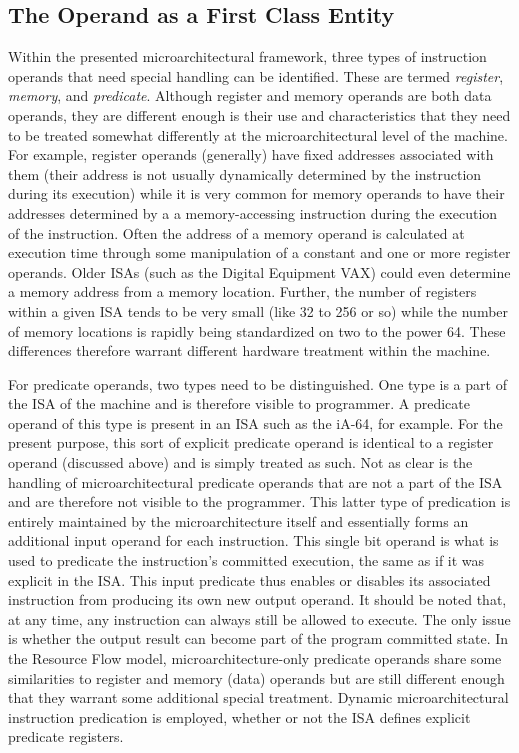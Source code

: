 \documentclass{book}
\begin{document}
\subsection{The Operand as a First Class Entity}
%
Within the presented microarchitectural framework, 
three types of instruction operands that need special handling
can be identified.
These are termed \textit{register}, \textit{memory}, and \textit{predicate}.
Although register and memory operands are both data operands,
they are different enough is their use and characteristics that
they need to be treated somewhat differently at the microarchitectural
level of the machine.  
For example, register operands (generally) have fixed addresses
associated with them (their address is not usually dynamically determined
by the instruction during its execution) while it is very common
for memory operands to have their addresses determined by a
a memory-accessing instruction during the execution of the instruction.
Often the address of a memory operand is calculated at execution
time through some manipulation of a constant and one or more register
operands.  Older ISAs (such as the Digital Equipment VAX) could
even determine a memory address from a memory location.
Further, the number of registers within a given ISA tends to be
very small (like 32 to 256 or so) while the number of memory
locations is rapidly being standardized on two to the power 64.
These differences therefore warrant different hardware treatment
within the machine.

For predicate operands, two types need to be distinguished.
One type is a part of the ISA of the machine and
is therefore visible to programmer.
A predicate operand of this type is present 
in an ISA such as the iA-64, for example. \cite{iA64}
For the present purpose, this sort of explicit predicate operand
is identical to a register operand (discussed above) and
is simply treated as such.
Not as clear is the handling of microarchitectural predicate operands
that are not a part of the ISA and are therefore not visible
to the programmer.
This latter type of predication is entirely maintained by the microarchitecture
itself and essentially forms an additional input operand
for each instruction.
This single bit operand is what is used to
predicate the instruction's committed execution, the same as
if it was explicit in the ISA.
This input predicate thus enables or disables its associated
instruction from producing its own new output operand.
It should be noted that, at any time, any instruction can
always still be allowed to execute.  The only issue is
whether the output result can become part of the program committed
state.
In the Resource Flow model, microarchitecture-only predicate operands
share some similarities to register and memory (data) operands
but are still different enough that they warrant some additional
special treatment.
Dynamic microarchitectural instruction predication is employed,
whether or not the ISA defines explicit predicate registers.
%
%
\end{document}
